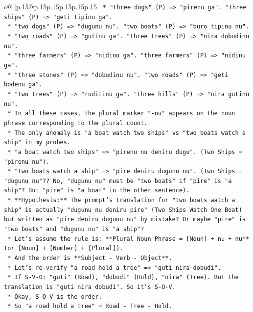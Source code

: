 \documentclass{article}
\begin{document}
{\begin{supertabular}{c@{$\;$}|p{.15\linewidth}@{}p{.15\linewidth}p{.15\linewidth}p{.15\linewidth}p{.15\linewidth}p{.15\linewidth}}
{{{\texttt{        *   "three dogs" (P) => "pirenu ga". "three ships" (P) => "geti tipinu ga".} \\
\texttt{        *   "two dogs" (P) => "dugunu nu". "two boats" (P) => "buro tipinu nu".} \\
\texttt{        *   "two roads" (P) => "gutinu ga". "three trees" (P) => "nira dobudinu nu".} \\
\texttt{        *   "three farmers" (P) => "nidinu ga". "three farmers" (P) => "nidinu ga".} \\
\texttt{        *   "three stones" (P) => "dobudinu nu". "two roads" (P) => "geti bodenu ga".} \\
\texttt{        *   "two trees" (P) => "ruditinu ga". "three hills" (P) => "nira gutinu nu".} \\
\texttt{        *   In all these cases, the plural marker "{-}nu" appears on the noun phrase corresponding to the plural count.} \\
\texttt{        *   The only anomaly is "a boat watch two ships" vs "two boats watch a ship" in my probes.} \\
\texttt{        *   "a boat watch two ships" => "pirenu nu deniru dugu". (Two Ships = "pirenu nu").} \\
\texttt{        *   "two boats watch a ship" => "pire deniru dugunu nu". (Two Ships = "dugunu nu"?? No, "dugunu nu" must be "two boats" if "pire" is "a ship"? But "pire" is "a boat" in the other sentence).} \\
\texttt{        *   **Hypothesis:** The prompt's translation for "two boats watch a ship" is actually "dugunu nu deniru pire" (Two Ships Watch One Boat) but written as "pire deniru dugunu nu" by mistake? Or maybe "pire" is "two boats" and "dugunu nu" is "a ship"?} \\
\texttt{        *   Let's assume the rule is: **Plural Noun Phrase = {[}Noun{]} + nu + nu** (or {[}Noun{]} + {[}Number{]} + {[}Plural{]}).} \\
\texttt{        *   And the order is **Subject {-} Verb {-} Object**.} \\
\texttt{        *   Let's re{-}verify "a road hold a tree" => "guti nira dobudi".} \\
\texttt{        *   If S{-}V{-}O: "guti" (Road), "dobudi" (Hold), "nira" (Tree). But the translation is "guti nira dobudi". So it's S{-}O{-}V.} \\
\texttt{        *   Okay, S{-}O{-}V is the order.} \\
\texttt{        *   So "a road hold a tree" = Road {-} Tree {-} Hold.} \\
}}}
\end{supertabular}}
\end{document}
